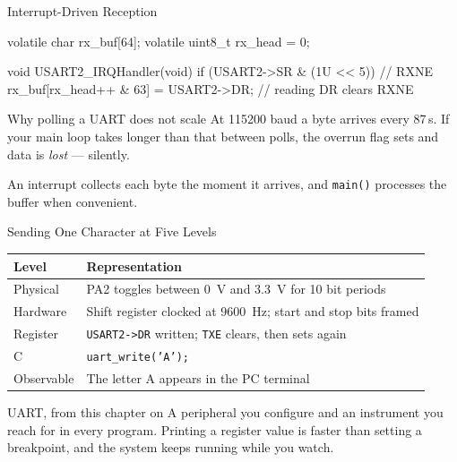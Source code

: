 \documentclass[9pt,aspectratio=169,xcolor=table]{beamer}
\begin{document}
\begin{frame}[fragile]{Interrupt-Driven Reception}
        \begin{cc}[basicstyle=\footnotesize\ttfamily]
volatile char     rx_buf[64];
volatile uint8_t  rx_head = 0;

void USART2_IRQHandler(void)
{
    if (USART2->SR & (1U << 5)) {        // RXNE
        rx_buf[rx_head++ & 63] = USART2->DR;   // reading DR clears RXNE
    }
}
\end{cc}

    \vspace{2mm}
    \begin{block}{Why polling a UART does not scale}
        At 115200 baud a byte arrives every \alert{87\,\textmu s}. If your main
        loop takes longer than that between polls, the \alert{overrun} flag sets
        and data is \emph{lost} --- silently.

        \vspace{1mm}
        An interrupt collects each byte the moment it arrives, and
        \texttt{main()} processes the buffer when convenient.
    \end{block}
\end{frame}

\begin{frame}{Sending One Character at Five Levels}
    \begin{center}
    {\small
    \striped
    \begin{tabular}{@{}l R{.65\textwidth}@{}}
        \toprule
        \textbf{Level} & \textbf{Representation} \\
        \midrule
        Physical    & PA2 toggles between 0~V and 3.3~V for 10 bit periods \\
        Hardware    & Shift register clocked at 9600~Hz; start and stop bits framed \\
        Register    & \texttt{USART2->DR} written; \texttt{TXE} clears, then sets again \\
        C           & \texttt{uart\_write('A');} \\
        Observable  & The letter A appears in the PC terminal \\
        \bottomrule
    \end{tabular}}
    \end{center}

    \vspace{3mm}
    \begin{block}{UART, from this chapter on}
        A peripheral you configure \alert{and} an instrument you reach for
        in every program. Printing a register value is faster than setting
        a breakpoint, and the system keeps running while you watch.
    \end{block}
\end{frame}
\end{document}
